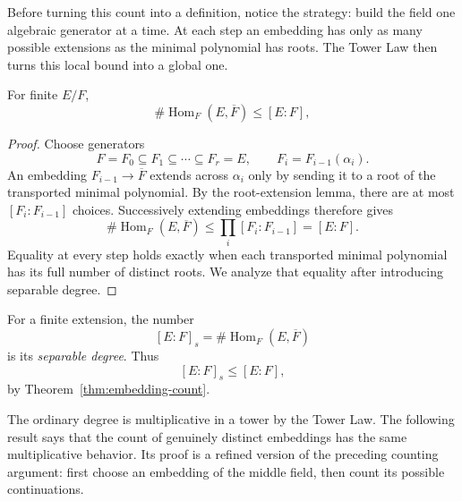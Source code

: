 Before turning this count into a definition, notice the strategy: build the
field one algebraic generator at a time.  At each step an embedding has only
as many possible extensions as the minimal polynomial has roots.  The Tower
Law then turns this local bound into a global one.

\begin{theorem}\label{thm:embedding-count}
For finite \(E/F\),
\[
\#\operatorname{Hom}_F(E,\overline F)\le [E:F],
\]
\end{theorem}
\begin{proof}
Choose generators
\[
F=F_0\subseteq F_1\subseteq\cdots\subseteq F_r=E,
\qquad
F_i=F_{i-1}(\alpha_i).
\]
An embedding \(F_{i-1}\to\overline F\) extends across \(\alpha_i\) only by
sending it to a root of the transported minimal polynomial.  By the
root-extension lemma, there are at most
\([F_i:F_{i-1}]\) choices.  Successively extending embeddings therefore
gives
\[
\#\operatorname{Hom}_F(E,\overline F)
\leq\prod_i[F_i:F_{i-1}]=[E:F].
\]
Equality at every step holds exactly when each transported minimal polynomial
has its full number of distinct roots.  We analyze that equality after
introducing separable degree.
\end{proof}

\begin{definition}
For a finite extension, the number
\[
[E:F]_s=\#\operatorname{Hom}_F(E,\overline F)
\]
is its \emph{separable degree}.  Thus
\[
[E:F]_s\leq[E:F],
\]
by Theorem~\ref{thm:embedding-count}.
\end{definition}

The ordinary degree is multiplicative in a tower by the Tower Law.  The
following result says that the count of genuinely distinct embeddings has the
same multiplicative behavior.  Its proof is a refined version of the
preceding counting argument: first choose an embedding of the middle field,
then count its possible continuations.

